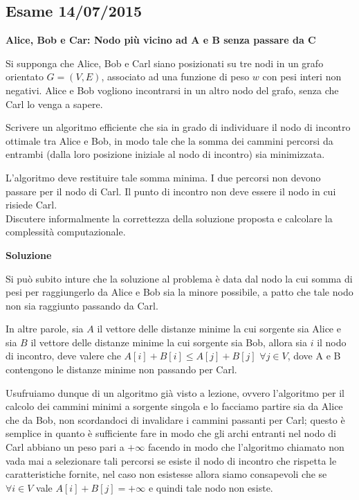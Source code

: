 \documentclass[../cheatSheetAlgoritmi.tex]{subfiles}
\begin{document}
\subsection{Esame 14/07/2015}
\textbf{Alice, Bob e Car: Nodo più vicino ad A e B senza passare da C} 

Si supponga che Alice, Bob e Carl siano posizionati su tre nodi in un grafo orientato $G= (V, E)$, associato ad una funzione di peso $w$ con pesi interi non negativi. Alice e Bob vogliono incontrarsi in un altro nodo del grafo, senza che Carl lo venga a sapere. 

Scrivere un algoritmo efficiente che sia in grado di individuare il nodo di incontro ottimale tra Alice e Bob, in modo tale che la somma dei cammini percorsi da entrambi (dalla loro posizione iniziale al nodo di incontro) sia minimizzata. 

L'algoritmo deve restituire tale somma minima. I due percorsi non devono passare per il nodo di Carl. Il punto di incontro non deve essere il nodo in cui risiede Carl. \\
Discutere informalmente la correttezza della soluzione proposta e calcolare la complessità computazionale. 

\textbf{Soluzione} 

Si può subito inture che la soluzione al problema è data dal nodo la cui somma di pesi per raggiungerlo da Alice e Bob sia la minore possibile, a patto che tale nodo non sia raggiunto passando da Carl. 

In altre parole, sia $A$ il vettore delle distanze minime la cui sorgente sia Alice e sia $B$ il vettore delle distanze minime la cui sorgente sia Bob, allora sia $i$ il nodo di incontro, deve valere che $A[i] + B[i] \leq A[j] + B[j]$ $ \forall j \in V$, dove A e B contengono le distanze minime non passando per Carl. 

Usufruiamo dunque di un algoritmo già visto a lezione, ovvero l'algoritmo per il calcolo dei cammini minimi a sorgente singola e lo facciamo partire sia da Alice che da Bob, non scordandoci di invalidare i cammini passanti per Carl; questo è semplice in quanto è sufficiente fare in modo che gli archi entranti nel nodo di Carl abbiano un peso pari a $+\infty$ facendo in modo che l'algoritmo chiamato non vada mai a selezionare tali percorsi se esiste il nodo di incontro che rispetta le caratteristiche fornite, nel caso non esistesse allora siamo consapevoli che se $\forall i \in V$ vale $A[i] + B[j] = +\infty$ e quindi tale nodo non esiste. 
\end{document}
